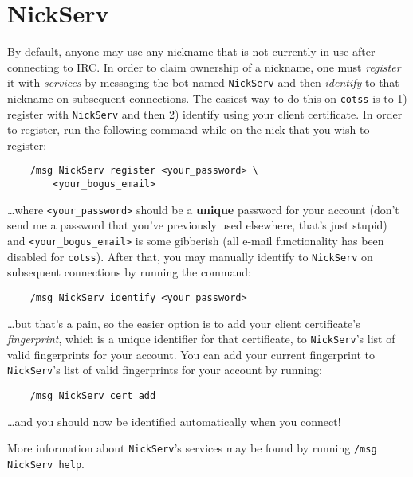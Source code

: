 \documentclass{article}
\begin{document}
{\section{NickServ}
By default, anyone may use any nickname that is not currently in use after connecting to IRC.  In order to claim ownership of a nickname, one must \textit{register} it with \textit{services} by messaging the bot named \texttt{NickServ} and then \textit{identify} to that nickname on subsequent connections.  The easiest way to do this on \texttt{cotss} is to 1) register with \texttt{NickServ} and then 2) identify using your client certificate.  In order to register, run the following command while on the nick that you wish to register:
\begin{lstlisting}
    /msg NickServ register <your_password> \
        <your_bogus_email>
\end{lstlisting}
\ldots where \texttt{<your\_password>} should be a \textbf{unique} password for your account (don't send me a password that you've previously used elsewhere, that's just stupid) and \texttt{<your\_bogus\_email>} is some gibberish (all e-mail functionality has been disabled for \texttt{cotss}).  After that, you may manually identify to \texttt{NickServ} on subsequent connections by running the command:
\begin{lstlisting}
    /msg NickServ identify <your_password>
\end{lstlisting}
\ldots but that's a pain, so the easier option is to add your client certificate's \textit{fingerprint}, which is a unique identifier for that certificate, to \texttt{NickServ}'s list of valid fingerprints for your account.  You can add your current fingerprint to \texttt{NickServ}'s list of valid fingerprints for your account by running:
\begin{lstlisting}
	/msg NickServ cert add
\end{lstlisting}
\ldots and you should now be identified automatically when you connect!

More information about \texttt{NickServ}'s services may be found by running \texttt{/msg NickServ help}.

}
\end{document}

